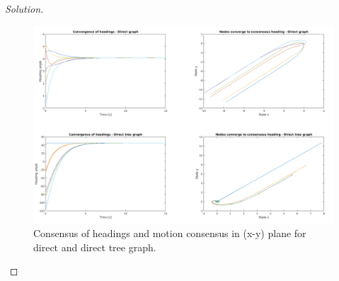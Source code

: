 \documentclass[12pt]{article}
\newenvironment{solution}{\begin{proof}[Solution]}{\end{proof}}
\begin{document}
\begin{solution}
\begin{figure}[!h]
	\includegraphics[scale=0.3]{figures/ConsensusSwarm.png}
	\centering
	\caption{Consensus of headings and motion consensus in (x-y) plane for direct and direct tree graph.}
	\label{cswarm}
\end{figure} 

\end{solution}
\end{document}
